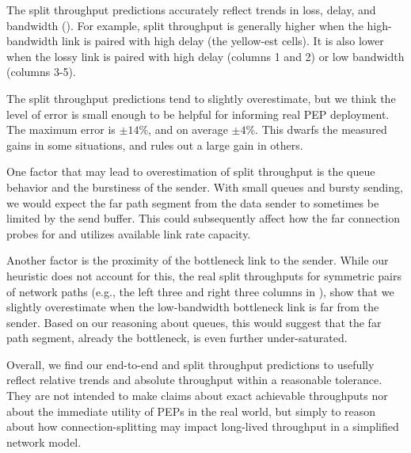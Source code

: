 The split throughput predictions accurately reflect trends in loss, delay, and
bandwidth (). For example, split throughput is
generally higher when the high-bandwidth link is paired with high delay
(the yellow-est cells). It is also lower when the lossy link is paired with
high delay (columns 1 and 2) or low bandwidth (columns 3-5).

The split throughput predictions tend to slightly overestimate, but we think
the level of error is small enough to be helpful for informing real PEP
deployment. The maximum error is $\pm14\%$, and on average $\pm4\%$. This
dwarfs the measured gains in some situations, and rules out a large gain in
others.

One factor that may lead to overestimation of split throughput is the queue
behavior and the burstiness of the sender. With small queues and bursty
sending, we would expect the far path segment from the data sender to sometimes
be limited by the send buffer. This could subsequently affect how the far
connection probes for and utilizes available link rate capacity.

Another factor is the proximity of the bottleneck link to the sender. While
our heuristic does not account for this, the real split throughputs for
symmetric pairs of network paths (e.g., the left three and right three columns
in ), show that we slightly overestimate
when the low-bandwidth bottleneck link is far from the sender.
Based on our reasoning about queues, this would suggest that the far path
segment, already the bottleneck, is even further under-saturated.

Overall, we find our end-to-end and split throughput predictions to usefully
reflect relative trends and absolute throughput within a
reasonable tolerance. They are not intended to make claims about exact achievable
throughputs nor about the immediate utility of PEPs in the real world,
but simply to reason about how connection-splitting may impact
long-lived throughput in a simplified network model.
